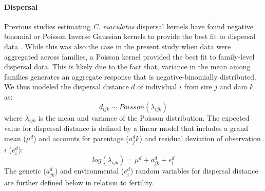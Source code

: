 \documentclass[11pt]{article}
\begin{document}
\paragraph{Dispersal}
Previous studies estimating \textit{C. maculatus} dispersal kernels have found negative binomial or Poisson Inverse Gaussian kernels to provide the best fit to dispersal data \citep{miller_sex_2013,wagner_genetic_2016,ochocki_rapid_2017}.
While this was also the case in the present study when data were aggregated across families, a Poisson kernel provided the best fit to family-level dispersal data.
This is likely due to the fact that, variance in the mean among families generates an aggregate response that is negative-binomially distributed.
We thus modeled the dispersal distance $d$ of individual $i$ from sire $j$ and dam $k$ as:
%
\begin{equation}\label{corr:dispersal_random}
  d_{ijk} \sim \mathit{Poisson}(\lambda_{ijk})
\end{equation}
%
where $\lambda_{ijk}$ is the mean and variance of the Poisson distribution.
The expected value for dispersal distance is defined by a linear model that includes a grand mean ($\mu^{d}$) and accounts for parentage ($a^{d}_jk$) and residual deviation of observation $i$ ($e^{d}_i$):
%
\begin{equation} \label{corr:dispersal_linmod}
  log(\lambda_{ijk}) = \mu^{d} + a^{d}_{jk} + e^{d}_{i}
\end{equation}
%
The genetic ($a^{d}_{jk}$) and environmental ($e^{d}_i$) random variables for dispersal distance are further defined below in relation to fertility.
\end{document}
